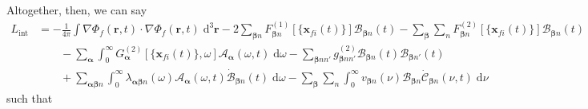 \documentclass{article}
\begin{document}
Altogether, then, we can say
\begin{equation}
\begin{split}
L_\mathrm{int} &= -\frac{1}{4\pi}\int\nabla\Phi_f(\mathbf{r},t)\cdot\nabla\Phi_f(\mathbf{r},t)\;\mathrm{d}^3\mathbf{r} - 2\sum_{\bm{\beta}n}F_{\bm{\beta}n}^{(1)}[\{\mathbf{x}_{fi}(t)\}]\mathcal{B}_{\bm{\beta}n}(t) - \sum_{\bm{\beta}}\sum_{n}F_{\bm{\beta}n}^{(2)}[\{\mathbf{x}_{fi}(t)\}]\mathcal{B}_{\bm{\beta}n}(t)\\
&\qquad - \sum_{\bm{\alpha}}\int_0^\infty G_{\bm{\alpha}}^{(2)}[\{\mathbf{x}_{fi}(t)\},\omega]\mathcal{A}_{\bm{\alpha}}(\omega,t)\;\mathrm{d}\omega - \sum_{\bm{\beta}nn'}g_{\bm{\beta}nn'}^{(2)}\mathcal{B}_{\bm{\beta}n}(t)\mathcal{B}_{\bm{\beta}n'}(t)\\
&\qquad + \sum_{\bm{\alpha}\bm{\beta}n}\int_0^\infty\lambda_{\bm{\alpha}\bm{\beta}n}(\omega)\mathcal{A}_{\bm{\alpha}}(\omega,t)\dot{\mathcal{B}}_{\bm{\beta}n}(t)\;\mathrm{d}\omega - \sum_{\bm{\beta}}\sum_{n}\int_0^\infty v_{\bm{\beta}n}(\nu)\mathcal{B}_{\bm{\beta}n}\dot{\mathcal{C}}_{\bm{\beta}n}(\nu,t)\;\mathrm{d}\nu
\end{split}
\end{equation}
such that
\end{document}
